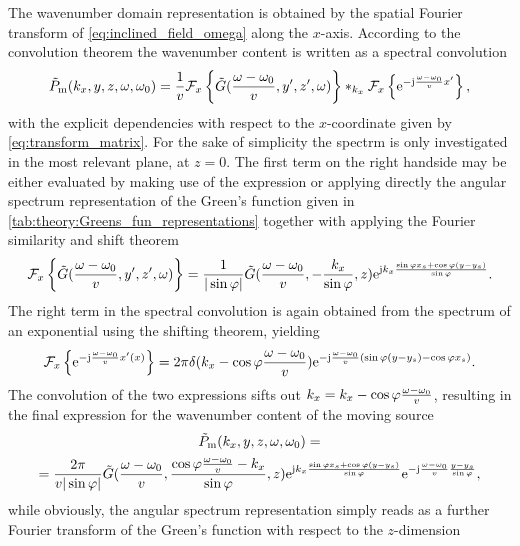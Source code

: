 The wavenumber domain representation is obtained by the spatial Fourier transform of \eqref{eq:inclined_field_omega} along the $x$-axis.
According to the convolution theorem the wavenumber content is written as a spectral convolution
\begin{equation}
\tilde{P}_{\mathrm{m}}(k_x,y,z,\omega,\omega_0) =
\frac{1}{v}
\mathcal{F}_x \left\{
\tilde{G}(\frac{\omega-\omega_0}{v}, y', z', \omega) \right\}
\ast_{k_x}
\mathcal{F}_x \left\{
\mathrm{e}^{-\mathrm{j} \frac{\omega-\omega_0}{v} x' }
 \right\},
\end{equation}
with the explicit dependencies with respect to the $x$-coordinate given by \eqref{eq:transform_matrix}.
For the sake of simplicity the spectrm is only investigated in the most relevant plane, at $z = 0$.
The first term on the right handside may be either evaluated by making use of the expression \cite[(6.677,9.)]{Gradshteyn2007} or applying directly the angular spectrum representation of the Green's function given in \eqref{tab:theory:Greens_fun_representations} together with applying the Fourier similarity and shift theorem
\begin{equation}
\mathcal{F}_x \left\{
\tilde{G}(\frac{\omega-\omega_0}{v}, y', z', \omega) \right\} =
\frac{1}{|\sin\varphi|} \tilde{G}( \frac{\omega-\omega_0}{v}, - \frac{k_x}{\sin\varphi} , z ) \mathrm{e}^{\mathrm{j} k_x \frac{\sin\varphi x_s + \cos\varphi (y-y_s)}{\sin\varphi}}.
\end{equation}
The right term in the spectral convolution is again obtained from the spectrum of an exponential using the shifting theorem, yielding
\begin{equation}
\mathcal{F}_x \left\{
\mathrm{e}^{-\mathrm{j} \frac{\omega-\omega_0}{v} x'(x)}
 \right\} = 2\pi \delta(k_x - \cos\varphi \frac{\omega-\omega_0}{v}) \mathrm{e}^{-\mathrm{j} \frac{\omega-\omega_0}{v}\left( \sin\varphi(y-y_s) - \cos\varphi x_s \right)}.
\end{equation}
The convolution of the two expressions sifts out $k_x = k_x - \cos\varphi \frac{\omega-\omega_0}{v}$, resulting in the final expression for the wavenumber content of the moving source
\begin{multline}
\tilde{P}_{\mathrm{m}}(k_x,y,z,\omega,\omega_0) = \\ =
\frac{2\pi}{v|\sin\varphi|} \tilde{G}( \frac{\omega-\omega_0}{v}, \frac{\cos\varphi \frac{\omega-\omega_0}{v}- k_x }{\sin\varphi} , z )  
\mathrm{e}^{\mathrm{j} k_x\frac{\sin\varphi x_s + \cos\varphi (y-y_s)}{\sin\varphi}}
\mathrm{e}^{-\mathrm{j} \frac{\omega-\omega_0}{v} \frac{y-y_s}{\sin\varphi}},
\end{multline}
while obviously, the angular spectrum representation simply reads as a further Fourier transform of the Green's function with respect to the $z$-dimension
